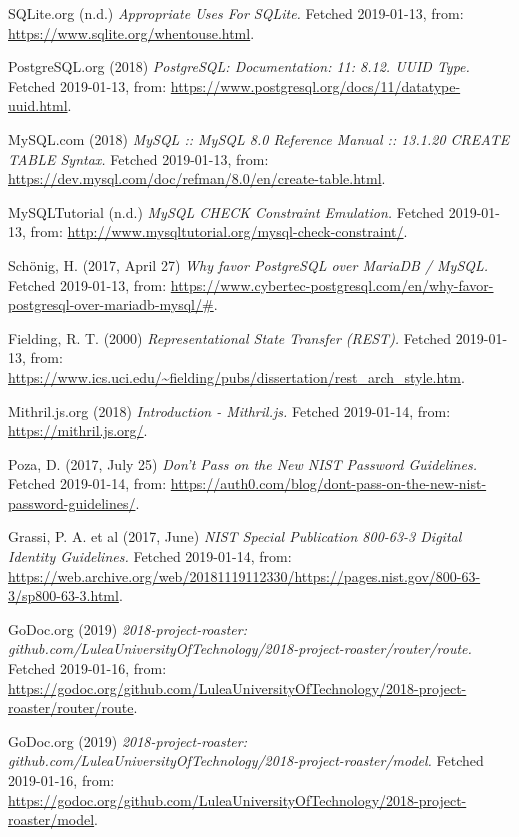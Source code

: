 \documentclass[12pt,a4paper]{report}
\begin{document}
{\begin{thebibliography}{1}
SQLite.org (n.d.) {\em Appropriate Uses For SQLite.} Fetched 2019-01-13, from: \url{https://www.sqlite.org/whentouse.html}.

PostgreSQL.org (2018) {\em PostgreSQL: Documentation: 11: 8.12. UUID Type.} Fetched 2019-01-13, from: \url{https://www.postgresql.org/docs/11/datatype-uuid.html}.

MySQL.com (2018) {\em MySQL :: MySQL 8.0 Reference Manual :: 13.1.20 CREATE TABLE Syntax.} Fetched 2019-01-13, from: \url{https://dev.mysql.com/doc/refman/8.0/en/create-table.html}.

MySQLTutorial (n.d.) {\em MySQL CHECK Constraint Emulation.} Fetched 2019-01-13, from: \url{http://www.mysqltutorial.org/mysql-check-constraint/}.

Schönig, H. (2017, April 27) {\em Why favor PostgreSQL over MariaDB / MySQL.} Fetched 2019-01-13, from:  \url{https://www.cybertec-postgresql.com/en/why-favor-postgresql-over-mariadb-mysql/#}.

 Fielding, R. T. (2000) {\em Representational State Transfer (REST).} Fetched 2019-01-13, from: \url{https://www.ics.uci.edu/~fielding/pubs/dissertation/rest_arch_style.htm}.

 Mithril.js.org (2018) {\em Introduction - Mithril.js.} Fetched 2019-01-14, from: \url{https://mithril.js.org/}.

 Poza, D. (2017, July 25) {\em Don't Pass on the New NIST Password Guidelines.} Fetched 2019-01-14, from: \url{https://auth0.com/blog/dont-pass-on-the-new-nist-password-guidelines/}.

 Grassi, P. A. et al (2017, June) {\em NIST Special Publication 800-63-3 Digital Identity Guidelines.} Fetched 2019-01-14, from: \url{https://web.archive.org/web/20181119112330/https://pages.nist.gov/800-63-3/sp800-63-3.html}.

 GoDoc.org (2019) {\em 2018-project-roaster: github.com/LuleaUniversityOfTechnology/2018-project-roaster/router/route.}
Fetched 2019-01-16, from:
\url{https://godoc.org/github.com/LuleaUniversityOfTechnology/2018-project-roaster/router/route}.

 GoDoc.org (2019) {\em 2018-project-roaster: github.com/LuleaUniversityOfTechnology/2018-project-roaster/model.}
Fetched 2019-01-16, from:
\url{https://godoc.org/github.com/LuleaUniversityOfTechnology/2018-project-roaster/model}.


\end{thebibliography}}
\end{document}
